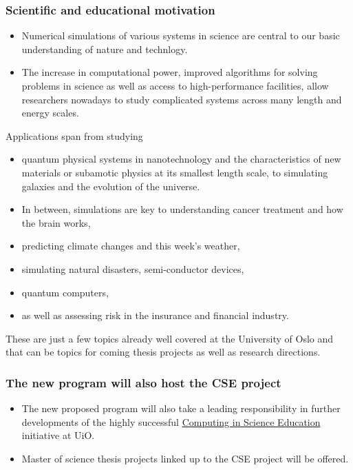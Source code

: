 \documentclass{beamer}
\begin{document}
\begin{frame}
\frametitle{Scientific and educational motivation}

\begin{block}{}
\begin{itemize}
\item Numerical simulations of various systems in science are central to our basic understanding of nature and technlogy.

\item The increase in computational power, improved algorithms for solving problems in science as well as access to high-performance facilities, allow researchers nowadays to study complicated systems across many length and energy scales. 
\end{itemize}

\noindent
Applications span from studying 
\begin{itemize}
 \item quantum physical systems in nanotechnology and the characteristics of new materials or subamotic physics at its smallest length scale, to simulating galaxies and the evolution of the universe.

 \item In between, simulations are key to understanding cancer treatment and how the brain works,

 \item predicting climate changes and this week's weather,

 \item simulating natural disasters, semi-conductor devices,

 \item quantum computers, 

 \item as well as assessing risk in the insurance and financial industry. 
\end{itemize}

\noindent
These are just a few topics
already well covered at the University of Oslo and that can be
topics for coming thesis projects as well as research directions.
\end{block}
\end{frame}

\begin{frame}
\frametitle{The new program will also host the CSE project}

\begin{block}{}

\begin{itemize}
\item The new proposed program will also take a leading responsibility in further developments of the highly successful \href{{http://www.mn.uio.no/english/about/collaboration/cse/}}{Computing in Science Education} initiative at UiO.  

\item Master of science thesis projects linked up to the CSE project will be offered.
\end{itemize}

\noindent
\end{block}
\end{frame}
\end{document}
